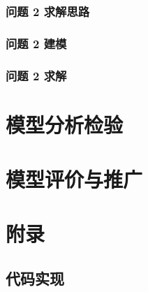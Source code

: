 \documentclass{article}
\begin{document}
\subsubsection{问题 2 求解思路}\label{subsubsec:problem2_idea}

\subsubsection{问题 2 建模}\label{subsubsec:problem2_model}

\subsubsection{问题 2 求解}\label{subsubsec:problem2_solve}

\section{模型分析检验}\label{sec:analysis_check}

\section{模型评价与推广}\label{sec:evaluation}

\section{附录}\label{sec:appendix}

\subsection{代码实现}\label{subsec:code}

\end{document}
